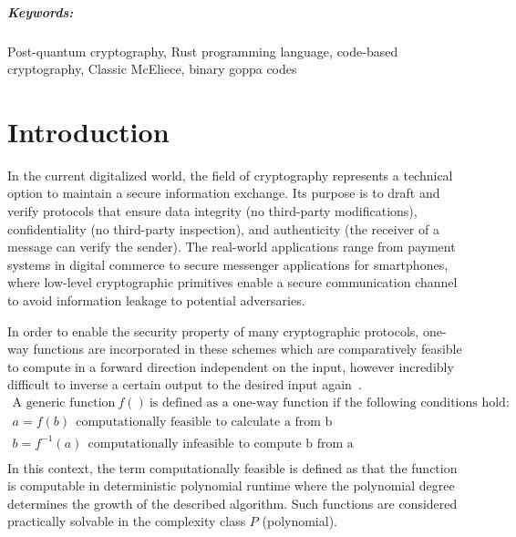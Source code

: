\documentclass[11pt,
  oneside,openany,    %
]{scrreprt}
\begin{document}
\paragraph{Keywords:}
Post-quantum cryptography, Rust programming language, code-based cryptography, Classic McEliece, binary goppa codes

\tableofcontents  %



\chapter{Introduction}
\label{chap:introduction}

In the current digitalized world, the field of cryptography represents a technical option to maintain a secure information exchange. Its purpose is to draft and verify protocols that ensure data integrity (no third-party modifications), confidentiality (no third-party inspection), and authenticity (the receiver of a message can verify the sender). The real-world applications range from payment systems in digital commerce to secure messenger applications for smartphones, where low-level cryptographic primitives enable a secure communication channel to avoid information leakage to potential adversaries.

In order to enable the security property of many cryptographic protocols, one-way functions are incorporated in these schemes which are comparatively feasible to compute in a forward direction independent on the input, however incredibly difficult to inverse a certain output to the desired input again~\cite{Kryptografie2016}.
\begin{gather*}
    \text{A generic function} \ f() \ \text{is defined as a one-way function if the following conditions hold:}\\
    a = f(b) \ \ \text{computationally feasible to calculate a from b}\\
    b = f^{-1}(a) \ \ \text{computationally infeasible to compute b from a}\\
\end{gather*}
In this context, the term computationally feasible is defined as that the function is computable in deterministic polynomial runtime where the polynomial degree determines the growth of the described algorithm. Such functions are considered practically solvable in the complexity class $P$ (polynomial).
\end{document}
